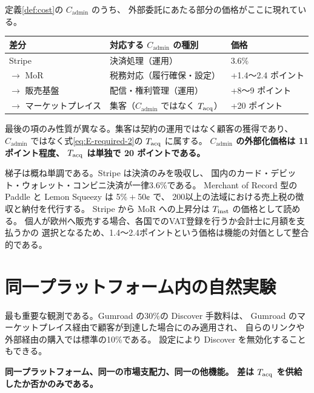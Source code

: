 \begin{remark}
\label{rem:ladder-is-cadmin}
定義\ref{def:cost}の $C_{\mathrm{admin}}$ のうち、
外部委託にあたる部分の価格がここに現れている。

\begin{center}
\begin{tabularx}{\textwidth}{@{}lXl@{}}
\toprule
差分 & 対応する $C_{\mathrm{admin}}$ の種別 & 価格 \\
\midrule
Stripe & 決済処理（運用） & 3.6\% \\
$\to$ MoR & 税務対応（履行確保・設定） & +1.4〜2.4 ポイント \\
$\to$ 販売基盤 & 配信・権利管理（運用） & +8〜9 ポイント \\
$\to$ マーケットプレイス & 集客（$C_{\mathrm{admin}}$ ではなく $T_{\rm acq}$） & +20 ポイント \\
\bottomrule
\end{tabularx}
\label{tab:cadmin-breakdown}
\end{center}

最後の項のみ性質が異なる。集客は契約の運用ではなく顧客の獲得であり、
$C_{\mathrm{admin}}$ ではなく式\eqref{eq:E-required-2}の $T_{\rm acq}$ に属する。
\textbf{$C_{\mathrm{admin}}$ の外部化価格は 11 ポイント程度、
$T_{\rm acq}$ は単独で 20 ポイントである。}
\end{remark}

梯子は概ね単調である。Stripe は決済のみを吸収し、
国内のカード・デビット・ウォレット・コンビニ決済が一律3.6\%である。
Merchant of Record 型の Paddle と Lemon Squeezy は 5\%${}+{}$50¢ で、
200以上の法域における売上税の徴収と納付を代行する。
Stripe から MoR への上昇分は $T_{\rm inst}$ の価格として読める。
個人が欧州へ販売する場合、各国でのVAT登録を行うか会計士に月額を支払うかの
選択となるため、1.4〜2.4ポイントという価格は機能の対価として整合的である。

\section{同一プラットフォーム内の自然実験}

最も重要な観測である。Gumroad の30\%の Discover 手数料は、
Gumroad のマーケットプレイス経由で顧客が到達した場合にのみ適用され、
自らのリンクや外部経由の購入では標準の10\%である。
設定により Discover を無効化することもできる。

\textbf{同一プラットフォーム、同一の市場支配力、同一の他機能。
差は $T_{\rm acq}$ を供給したか否かのみである。}

